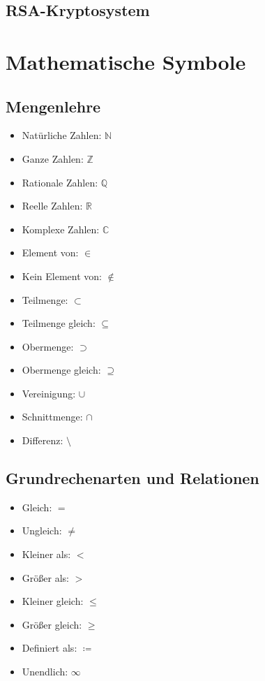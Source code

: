 \documentclass[a4paper,10pt]{article}
\begin{document}
\subsection{RSA-Kryptosystem}






\section{Mathematische Symbole}

\subsection{Mengenlehre}
\begin{itemize}
    \item Natürliche Zahlen: $\mathbb{N}$
    \item Ganze Zahlen: $\mathbb{Z}$
    \item Rationale Zahlen: $\mathbb{Q}$
    \item Reelle Zahlen: $\mathbb{R}$
    \item Komplexe Zahlen: $\mathbb{C}$
    \item Element von: $\in$
    \item Kein Element von: $\notin$
    \item Teilmenge: $\subset$
    \item Teilmenge gleich: $\subseteq$
    \item Obermenge: $\supset$
    \item Obermenge gleich: $\supseteq$
    \item Vereinigung: $\cup$
    \item Schnittmenge: $\cap$
    \item Differenz: $\setminus$
\end{itemize}

\subsection{Grundrechenarten und Relationen}
\begin{itemize}
    \item Gleich: $=$
    \item Ungleich: $\neq$
    \item Kleiner als: $<$
    \item Größer als: $>$
    \item Kleiner gleich: $\leq$
    \item Größer gleich: $\geq$
    \item Definiert als: $\coloneqq$
    \item Unendlich: $\infty$
\end{itemize}
\end{document}

